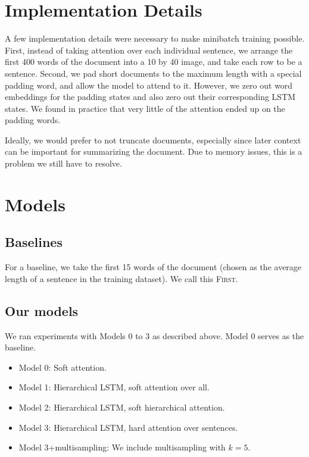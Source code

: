 \documentclass[11pt]{report}
\begin{document}
\section{Implementation Details}

A few implementation details were necessary to make minibatch training possible. First, instead of taking attention over each individual sentence, we arrange the first 400 words of the document into a 10 by 40 image, and take each row to be a sentence. Second, we pad short documents to the maximum length with a special padding word, and allow the model to attend to it. However, we zero out word embeddings for the padding states and also zero out their corresponding LSTM states. We found in practice that very little of the attention ended up on the padding words.

Ideally, we would prefer to not truncate documents, especially since later context can be important for summarizing the document. Due to memory issues, this is a problem we still have to resolve.

\section{Models}

\subsection{Baselines}

For a baseline, we take the first 15 words of the document (chosen as the average length of a sentence in the training dataset). We call this \textsc{First}. 



\subsection{Our models}

We ran experiments with Models 0 to 3 as described above. Model 0 serves as the baseline.

\begin{itemize}
\item Model 0: Soft attention.
\item Model 1: Hierarchical LSTM, soft attention over all.
\item Model 2: Hierarchical LSTM, soft hierarchical attention.
\item Model 3: Hierarchical LSTM, hard attention over sentences.
\item Model 3+multisampling: We include multisampling with $k=5$.
\end{itemize}
\end{document}
